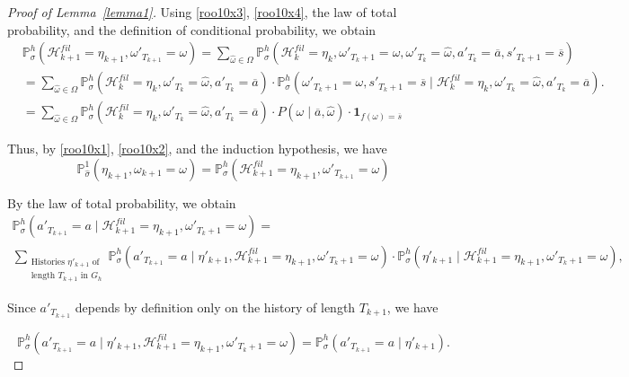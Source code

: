 \documentclass[10pt,a4paper]{amsart}
\renewcommand{\P}{\mathbb{P}}
\begin{document}
\begin{proof}[Proof of Lemma~\ref{lemma1}]
Using \eqref{roo10x3}, \eqref{roo10x4}, the law of total probability, and the definition of conditional probability, we obtain
\begin{equation}
\begin{aligned}
&\P_{\sigma}^h(\mathcal H^{fil}_{k+1} = \eta_{k+1}, \omega'_{T_{k+1}} = \omega) = \sum_{\widehat \omega \in \Omega}
\P_{\sigma}^h(\mathcal H^{fil}_{k} = \eta_{k}, \omega'_{T_{k}+1} = \omega, \omega'_{T_{k}} = \widehat \omega, a'_{T_{k}} = \overline a, s'_{T_{k}+1} = \overline s) \\
&=
\sum_{\widehat \omega \in \Omega}
\P_{\sigma}^h(\mathcal H^{fil}_{k} = \eta_{k}, \omega'_{T_{k}} = \widehat \omega, a'_{T_{k}} = \overline a) \cdot 
\P_{\sigma}^h(\omega'_{T_{k}+1} = \omega, s'_{T_{k}+1} = \overline s \mid \mathcal H^{fil}_{k} = \eta_{k}, \omega'_{T_{k}} = \widehat \omega, a'_{T_{k}} = \overline a). \\
&=
\sum_{\widehat \omega \in \Omega}
\P_{\sigma}^h(\mathcal H^{fil}_{k} = \eta_{k}, \omega'_{T_{k}} = \widehat \omega, a'_{T_{k}} = \overline a) \cdot P(\omega \mid \overline a, \widehat \omega) \cdot \mathbf{1}_{f(\omega) = \overline s}
\end{aligned}
\label{roo10x2}
\end{equation}


Thus, by \eqref{roo10x1}, \eqref{roo10x2}, and the induction hypothesis, we have
\begin{equation}
\mathbb{P}_{\widehat{\sigma}}^1(\eta_{k+1}, \omega_{k+1} = \omega) = \P_{\sigma}^h(\mathcal H^{fil}_{k+1} = \eta_{k+1}, \omega'_{T_{k+1}} = \omega)
\label{roo08}
\end{equation}

By the law of total probability, we obtain
\begin{multline}
\P_{\sigma}^h(a'_{T_{k+1}} = a \mid \mathcal H^{fil}_{k+1} = \eta_{k+1}, \omega'_{T_{k}+1} = \omega) = \\ 
\sum_{\substack{\text{Histories } \eta'_{k+1} \text{ of} \\ \text{length } T_{k+1} \text{ in } G_h}}
\P_{\sigma}^h(a'_{T_{k+1}} = a \mid \eta'_{k+1}, \mathcal H^{fil}_{k+1} = \eta_{k+1}, \omega'_{T_{k}+1} = \omega) \cdot \P_{\sigma}^h(\eta'_{k+1} \mid \mathcal H^{fil}_{k+1} = \eta_{k+1}, \omega'_{T_{k}+1} = \omega),
\label{roo04}
\end{multline}

Since $a'_{T_{k+1}}$ depends by definition only on the history of length $T_{k+1}$, we have

\begin{equation}
\P_{\sigma}^h(a'_{T_{k+1}} = a \mid \eta'_{k+1}, \mathcal H^{fil}_{k+1} = \eta_{k+1}, \omega'_{T_{k}+1} = \omega) = \P_{\sigma}^h(a'_{T_{k+1}} = a \mid \eta'_{k+1}).
\label{roo03}
\end{equation}


\end{proof}
\end{document}
